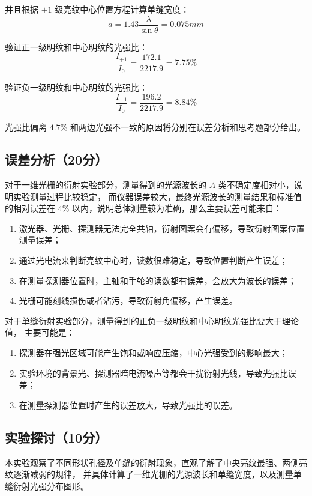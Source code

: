 \documentclass{Phyport}
\begin{document}
\FloatBarrier

并且根据 $\pm 1$ 级亮纹中心位置方程计算单缝宽度：
\[
a = 1.43 \frac{\lambda}{\sin \theta} = 0.075 mm
\]

验证正一级明纹和中心明纹的光强比：
\[
\frac{I_{+1}}{I_0} = \frac{172.1}{2217.9} = 7.75 \%
\]

验证负一级明纹和中心明纹的光强比：
\[
\frac{I_{-1}}{I_0} = \frac{196.2}{2217.9} = 8.84 \%
\]

光强比偏离 $4.7 \%$ 和两边光强不一致的原因将分别在误差分析和思考题部分给出。

\subsection{误差分析（20分）}

对于一维光栅的衍射实验部分，测量得到的光源波长的 $A$ 类不确定度相对小，说明实验测量过程比较稳定，
而仪器误差较大，最终光源波长的测量结果和标准值的相对误差在 $4 \%$ 以内，说明总体测量较为准确，那么主要误差可能来自：
\begin{enumerate}
    \item 激光器、光栅、探测器无法完全共轴，衍射图案会有偏移，导致衍射图案位置测量误差；
    \item 通过光电流来判断亮纹中心时，读数很难稳定，导致位置判断产生误差；
    \item 在测量探测器位置时，主轴和手轮的读数都有误差，会放大为波长的误差；
    \item 光栅可能刻线损伤或者沾污，导致衍射角偏移，产生误差。
\end{enumerate}

对于单缝衍射实验部分，测量得到的正负一级明纹和中心明纹光强比要大于理论值，
主要可能是：
\begin{enumerate}
    \item 探测器在强光区域可能产生饱和或响应压缩，中心光强受到的影响最大；
    \item 实验环境的背景光、探测器暗电流噪声等都会干扰衍射光线，导致光强比误差；
    \item 在测量探测器位置时产生的误差放大，导致光强比的误差。
\end{enumerate}

\subsection{实验探讨（10分）}

本实验观察了不同形状孔径及单缝的衍射现象，直观了解了中央亮纹最强、两侧亮纹逐渐减弱的规律，
并具体计算了一维光栅的光源波长和单缝宽度，以及测量单缝衍射光强分布图形。
\end{document}
